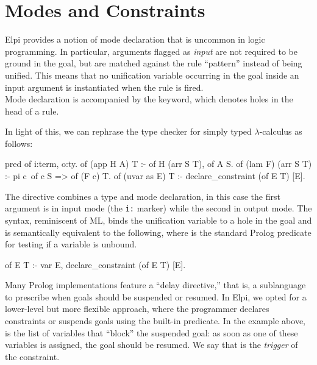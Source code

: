 \documentclass{these-ISSS}
\newenvironment{elpicode}
  {\VerbatimEnvironment\begin{elpibox}\begin{xelpicode}}{\end{xelpicode}
\end{elpibox}}
\begin{document}
\section{Modes and Constraints}\label{sec:modes}


Elpi provides a notion of mode declaration that is uncommon in logic
programming. In particular, arguments flagged as \emph{input} are not required to be
ground in the goal, but are matched against the rule ``pattern'' instead of
being unified. This means that no unification variable occurring in the goal
inside an input argument is instantiated when the rule is fired.
~\\

Mode declaration is accompanied by the  keyword, which denotes
holes in the head of a rule.

In light of this, we can rephrase the type checker for simply typed
$\lambda$-calculus as follows:

\begin{elpicode}
pred of i:term, o:ty.
of (app H A) T :- of H (arr S T), of A S.
of (lam F) (arr S T) :- pi c\ of c S => of (F c) T.
of (uvar as E) T :- declare_constraint (of E T) [E].
\end{elpicode}

The  directive combines a type and mode declaration,
in this case the first argument is in input mode (the \texttt{i:} marker)
while the second in output mode.
The  syntax, reminiscent of ML,
binds the unification variable  to a hole in the
goal and is semantically equivalent to the following, where  is
the standard Prolog predicate for testing if a variable is unbound.
\begin{elpicode}
of E T :- var E,
  declare_constraint (of E T) [E].
\end{elpicode}
Many Prolog implementations feature a ``delay directive,'' that is, a
sublanguage to prescribe when goals should be suspended or resumed. In Elpi,
we opted for a lower-level but more flexible approach, where the programmer
declares constraints or suspends goals using the 
built-in predicate. In the example above, \elpi{[E]} is the list of variables
that ``block'' the suspended goal: as soon as one of these variables is
assigned, the goal should be resumed. We say that  is the \emph{trigger} of
the constraint.
\end{document}

